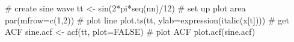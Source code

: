 \begin{Schunk}
\begin{Sinput}
 # create sine wave
 tt <- sin(2*pi*seq(nn)/12)
 # set up plot area
 par(mfrow=c(1,2))
 # plot line
 plot.ts(tt, ylab=expression(italic(x[t])))
 # get ACF
 sine.acf <- acf(tt, plot=FALSE)
 # plot ACF
 plot.acf(sine.acf)
\end{Sinput}
\end{Schunk}
